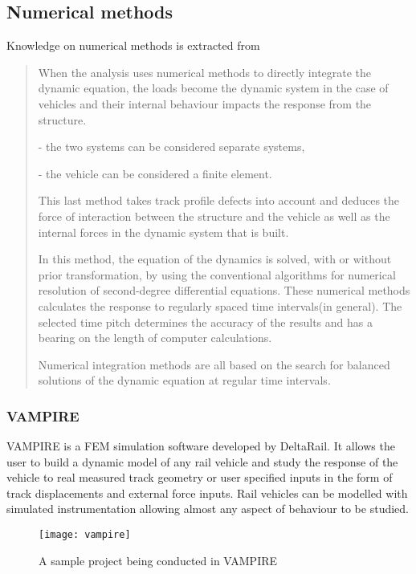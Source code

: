 \subsection{Numerical methods}

Knowledge on numerical methods is extracted from \citet{UIC776-2}

\begin{quote}

When the analysis uses numerical methods to directly integrate the dynamic equation, the loads become the dynamic system in the case of vehicles and their internal behaviour impacts the response from the structure.

- the two systems can be considered separate systems,

- the vehicle can be considered a finite element.

This last method takes track profile defects into account and deduces the force of interaction between the structure and the vehicle as well as the internal forces in the dynamic system that is built.

In this method, the equation of the dynamics is solved, with or without prior transformation, by using the conventional algorithms for numerical resolution of second-degree differential equations. These numerical methods calculates the response to regularly spaced time intervals(in general). The selected time pitch determines the accuracy of the results and has a bearing on the length of computer calculations.

Numerical integration methods are all based on the search for balanced solutions of the dynamic equation at regular time intervals.

\end{quote}

\subsubsection{VAMPIRE}

VAMPIRE is a FEM simulation software developed by DeltaRail. It allows the user to build a dynamic model of any rail vehicle and study the response of the vehicle to real measured track geometry or user specified inputs in the form of track displacements and external force inputs. Rail vehicles can be modelled with simulated instrumentation allowing almost any aspect of behaviour to be studied. 

\begin{figure}[h!]
    \centering
    \texttt{[image: vampire]}
    \caption{A sample project being conducted in VAMPIRE}
    \label{fig:vampire}
\end{figure}

